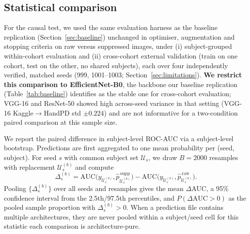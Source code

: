 \documentclass[3p,final,10pt]{elsarticle}
\let\oldsubsection\subsection
\renewcommand{\subsection}{\FloatBarrier\oldsubsection}
\begin{document}
\subsection{Statistical comparison}
\label{sec:stats}
For the causal test, we used the same evaluation harness as the baseline
replication (Section~\ref{sec:baseline}) unchanged in optimiser,
augmentation and stopping criteria on raw versus suppressed images,
under (i) subject-grouped within-cohort evaluation and
(ii) cross-cohort external validation (train on one cohort, test on the
other, no shared subjects), each over four independently verified, matched
seeds (999, 1001--1003; Section~\ref{sec:limitations}). \textbf{We restrict
this comparison to EfficientNet-B0}, the backbone our baseline replication
(Table~\ref{tab:baseline}) identifies as the stable one for cross-cohort
evaluation; VGG-16 and ResNet-50 showed high across-seed variance in that
setting (VGG-16 Kaggle$\to$HandPD std $\pm0.224$) and are not informative
for a two-condition paired comparison at this sample size.

We report the paired difference in subject-level ROC-AUC via a subject-level
bootstrap. Predictions are first aggregated to one mean probability per
(seed, subject). For seed $s$ with common subject set $\mathcal{U}_s$, we
draw $B=2000$ resamples with replacement $\mathcal{U}_s^{(b)}$ and compute
\begin{equation}
\Delta_s^{(b)}=\mathrm{AUC}\bigl(y_{\mathcal{U}_s^{(b)}},\hat p^{\,\mathrm{supp}}_{\mathcal{U}_s^{(b)}}\bigr)
              -\mathrm{AUC}\bigl(y_{\mathcal{U}_s^{(b)}},\hat p^{\,\mathrm{raw}}_{\mathcal{U}_s^{(b)}}\bigr).
\label{eq:boot}
\end{equation}
Pooling $\{\Delta_s^{(b)}\}$ over all seeds and resamples gives the mean
$\Delta$AUC, a 95\% confidence interval from the 2.5th/97.5th percentiles,
and $P(\Delta\mathrm{AUC}>0)$ as the pooled sample proportion with
$\Delta_s^{(b)}>0$. When a prediction
file contains multiple architectures, they are never pooled within a
subject/seed cell for this statistic each comparison is architecture-pure.
\end{document}
